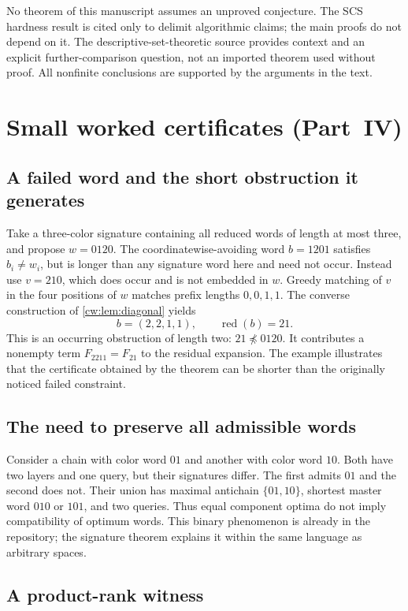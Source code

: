 \documentclass[11pt,letterpaper]{article}
\numberwithin{equation}{section}
\theoremstyle{definition}
\theoremstyle{remark}
\theoremstyle{definition}
\newcommand{\red}{\operatorname{red}}
\begin{document}
No theorem of this manuscript assumes an unproved conjecture. The SCS hardness
result is cited only to delimit algorithmic claims; the main proofs do not
depend on it. The descriptive-set-theoretic source provides context and an
explicit further-comparison question, not an imported theorem used without
proof. All nonfinite conclusions are supported by the arguments in the text.

\section{Small worked certificates (Part~IV)}
\label{cw:app:certificates}

\subsection{A failed word and the short obstruction it generates}

Take a three-color signature containing all reduced words of length at most
three, and propose $w=0120$. The coordinatewise-avoiding word $b=1201$
satisfies $b_i\ne w_i$, but is longer than any signature word here and need
not occur. Instead use $v=210$, which does occur and is not embedded in $w$.
Greedy matching of $v$ in the four positions of $w$ matches prefix lengths
$0,0,1,1$. The converse construction of \cref{cw:lem:diagonal} yields
\[
 b=(2,2,1,1),\qquad \red(b)=21.
\]
This is an occurring obstruction of length two: $21\not\preceq0120$.
It contributes a nonempty term $F_{2211}=F_{21}$ to the residual expansion.
The example illustrates that the certificate obtained by the theorem can be
shorter than the originally noticed failed constraint.

\subsection{The need to preserve all admissible words}

Consider a chain with color word $01$ and another with color word $10$.
Both have two layers and one query, but their signatures differ. The first
admits $01$ and the second does not. Their union has maximal antichain
$\{01,10\}$, shortest master word $010$ or $101$, and two queries.
Thus equal component optima do not imply compatibility of optimum words.
This binary phenomenon is already in the repository; the signature theorem
explains it within the same language as arbitrary spaces.

\subsection{A product-rank witness}
\end{document}
